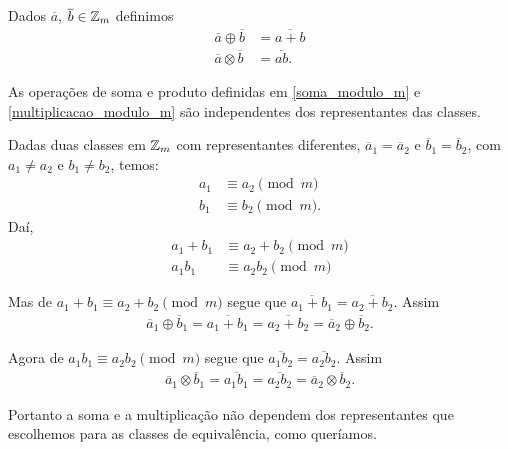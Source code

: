 \begin{definicao}
    Dados $\overline{a}$, $\overline{b} \in \mathbb{Z}_m$ definimos
    \begin{align}
        \overline{a}\oplus\overline{b} &= \overline{a + b}\label{soma_modulo_m}\\
        \overline{a}\otimes\overline{b} &= \overline{ab}.\label{multiplicacao_modulo_m}
    \end{align}
\end{definicao}

\begin{proposicao}
    As opera{\c c}{\~o}es de soma e produto definidas em \eqref{soma_modulo_m} e \eqref{multiplicacao_modulo_m} s{\~a}o independentes dos representantes das classes.
\end{proposicao}
\begin{prova}
    Dadas duas classes em $\mathbb{Z}_m$ com representantes diferentes, $\overline{a}_{1} = \overline{a}_{2}$ e  $\overline{b}_{1} = \overline{b}_{2}$, com $a_{1}\ne a_{2}$ e $b_{1}\ne b_{2}$,  temos:
            \begin{align*}
                a_1 &\equiv a_2 \pmod m\\
                b_1 &\equiv b_2 \pmod m.
            \end{align*}
            Daí,
            \begin{align*}
                a_1 + b_1 &\equiv a_2 + b_2 \pmod m\\
                a_1b_1 &\equiv a_2b_2 \pmod m
            \end{align*}

        Mas de $a_1 + b_1 \equiv a_2 + b_2 \pmod m$ segue que $\overline{a_1 + b_1} = \overline{a_2 + b_2}$. Assim
        \begin{align*}
            \overline{a}_{1}\oplus \overline{b}_{1} = \overline{a_{1}+b_{1}} = \overline{a_{2} + b_{2}} = \overline{a}_{2}\oplus \overline{b}_{2}.
        \end{align*}

        Agora de $a_1b_1 \equiv a_2b_2 \pmod m$  segue que $\overline{a_1b_2} =  \overline{a_2b_2}$. Assim
        \begin{align*}
            \overline{a}_{1}\otimes \overline{b}_{1} = \overline{a_{1}b_{1}} = \overline{a_{2}b_{2}} = \overline{a}_{2}\otimes\overline{b}_{2}.
        \end{align*}

        Portanto a soma e a multiplicação não dependem dos representantes que escolhemos para as classes de equivalência, como queríamos.\hspace{.3cm}
\end{prova}

